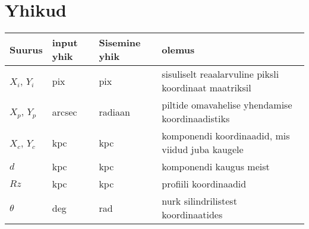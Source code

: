 \documentclass{article}
\begin{document}
	\section{Yhikud} %
	\label{sec:yhikud}
	\begin{tabular}{llll}
		Suurus & input yhik & Sisemine yhik & olemus\\
		\hline
		$X_i$, $Y_i$ & pix & pix & sisuliselt reaalarvuline piksli koordinaat maatriksil\\
		$X_p$, $Y_p$ & arcsec & radiaan & piltide omavahelise yhendamise koordinaadistiks\\
		$X_c$, $Y_c$ & kpc & kpc & komponendi koordinaadid, mis viidud juba kaugele\\
		$d$ & kpc & kpc & komponendi kaugus meist\\
		$Rz$ & kpc & kpc & profiili koordinaadid \\
		$\theta$ & deg & rad & nurk silindrilistest koordinaatides\\
	\end{tabular}
	
	
	
	
\end{document}
